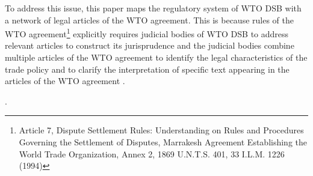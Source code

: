 To address this issue, 
this paper maps 
the regulatory system of WTO DSB 
with a network of legal articles 
of the WTO agreement. 
This is because rules of the WTO agreement\footnote{Article 7, Dispute Settlement Rules: Understanding on Rules and Procedures Governing the Settlement of Disputes, Marrakesh Agreement Establishing the World Trade Organization, Annex 2, 1869 U.N.T.S. 401, 33 I.L.M. 1226 (1994)} 
explicitly requires judicial bodies of WTO DSB to address
relevant articles to construct its jurisprudence
and the judicial bodies combine multiple articles of the WTO agreement to 
identify the legal characteristics of the trade policy 
and to clarify the interpretation of specific text appearing in the articles of the WTO agreement \citep{oesch2003standards}.


.


